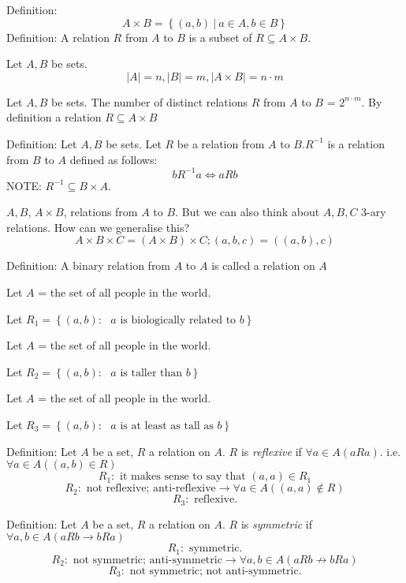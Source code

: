 Definition: \[ A \times B = \left\{ (a,b)\ |\ a \in A, b \in B \right\}\]
Definition: A relation $R$ from $A$ to $B$ is a subset of $R\subseteq A \times B$.

\begin{theorem}
Let $A,B$ be sets.
\[ |A| = n, |B| = m, |A \times B| = n\cdot m\] 
\end{theorem}
\begin{theorem}
Let $A,B$ be sets. The number of distinct relations $R$ from $A$ to $B$ = $2^{n\cdot m}$. By definition a relation $R\subseteq A \times B$
\end{theorem}
\noindent
Definition: Let $A,B$ be sets. Let $R$ be a relation from $A$ to $B$.$R^{-1}$ is a relation from $B$ to $A$ defined as follows:
\[ bR^{-1}a \iff aRb\]
NOTE: $R^{-1}\subseteq B \times A$.

\noindent
$A,B$, $A \times B$, relations from $A$ to $B$. But we can also think about $A,B,C$ 3-ary relations. How can we generalise this?
\[ A \times B \times C = (A \times B) \times C; (a,b,c) = ((a,b),c) \]

\noindent
Definition: A binary relation from $A$ to $A$ is called a relation on $A$
\begin{example}
Let $A$ = the set of all people in the world. 

Let $R_1 = \left\{ (a,b) : \text{ $a$ is biologically related to $b$} \right\}$
\end{example}
\begin{example}
Let $A$ = the set of all people in the world. 

Let $R_2 = \left\{ (a,b) : \text{ $a$ is taller than $b$} \right\}$
\end{example}
\begin{example}
Let $A$ = the set of all people in the world. 

Let $R_3 = \left\{ (a,b) : \text{ $a$ is at least as tall as $b$} \right\}$
\end{example}
\noindent
Definition: Let $A$ be a set, $R$ a relation on $A$. $R$ is \emph{reflexive} if $\forall a\in A (aRa)$. i.e. $\forall a \in A ((a,b)\in R)$
\[ R_1 : \text{ it makes sense to say that } (a,a) \in R_1 \]
\[ R_2 : \text{ not reflexive; anti-reflexive} \to \forall a \in A ((a,a) \not \in R) \]
\[ R_3 : \text{ reflexive.} \]

\noindent
Definition: Let $A$ be a set, $R$ a relation on $A$. $R$ is \emph{symmetric} if $\forall a,b \in A (aRb \to bRa)$
\[ R_1 : \text{ symmetric.}\]
\[ R_2 : \text{ not symmetric; anti-symmetric} \to \forall a,b \in A (aRb \not \to bRa) \]
\[ R_3 : \text{ not symmetric; not anti-symmetric.} \]

